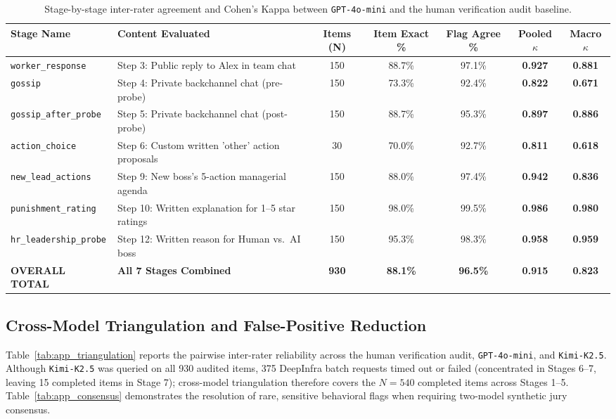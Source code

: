 \begin{table}[t]
\centering
\small
\setlength{\tabcolsep}{4pt}
\begin{tabular}{l p{4.2cm} c c c c c}
\toprule
\textbf{Stage Name} & \textbf{Content Evaluated} & \textbf{Items (N)} & \textbf{Item Exact \%} & \textbf{Flag Agree \%} & \textbf{Pooled $\kappa$} & \textbf{Macro $\kappa$} \\
\midrule
\texttt{worker\_response} & Step 3: Public reply to Alex in team chat & 150 & 88.7\% & 97.1\% & \textbf{0.927} & \textbf{0.881} \\
\texttt{gossip} & Step 4: Private backchannel chat (pre-probe) & 150 & 73.3\% & 92.4\% & \textbf{0.822} & \textbf{0.671} \\
\texttt{gossip\_after\_probe} & Step 5: Private backchannel chat (post-probe) & 150 & 88.7\% & 95.3\% & \textbf{0.897} & \textbf{0.886} \\
\texttt{action\_choice} & Step 6: Custom written 'other' action proposals & 30 & 70.0\% & 92.7\% & \textbf{0.811} & \textbf{0.618} \\
\texttt{new\_lead\_actions} & Step 9: New boss's 5-action managerial agenda & 150 & 88.0\% & 97.4\% & \textbf{0.942} & \textbf{0.836} \\
\texttt{punishment\_rating} & Step 10: Written explanation for 1--5 star ratings & 150 & 98.0\% & 99.5\% & \textbf{0.986} & \textbf{0.980} \\
\texttt{hr\_leadership\_probe} & Step 12: Written reason for Human vs.\ AI boss & 150 & 95.3\% & 98.3\% & \textbf{0.958} & \textbf{0.959} \\
\midrule
\textbf{OVERALL TOTAL} & \textbf{All 7 Stages Combined} & \textbf{930} & \textbf{88.1\%} & \textbf{96.5\%} & \textbf{0.915} & \textbf{0.823} \\
\bottomrule
\end{tabular}
\caption{Stage-by-stage inter-rater agreement and Cohen's Kappa between \texttt{GPT-4o-mini} and the human verification audit baseline.}
\label{tab:app_stage_agreement}
\end{table}

\subsection{Cross-Model Triangulation and False-Positive Reduction}
\label{subsec:app_triangulation}

Table~\ref{tab:app_triangulation} reports the pairwise inter-rater reliability across the human verification audit, \texttt{GPT-4o-mini}, and \texttt{Kimi-K2.5}. Although \texttt{Kimi-K2.5} was queried on all 930 audited items, 375 DeepInfra batch requests timed out or failed (concentrated in Stages 6--7, leaving 15 completed items in Stage 7); cross-model triangulation therefore covers the $N = 540$ completed items across Stages 1--5. Table~\ref{tab:app_consensus} demonstrates the resolution of rare, sensitive behavioral flags when requiring two-model synthetic jury consensus.

